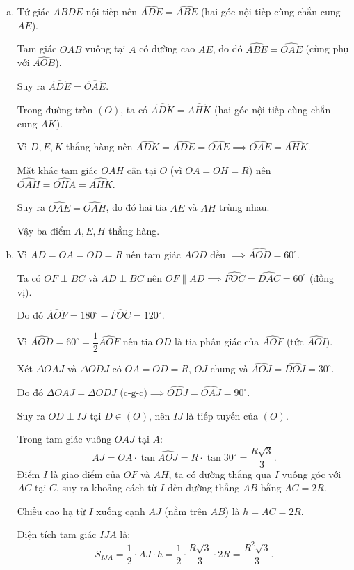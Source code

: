 \begin{bt}
{\begin{enumerate}[a)]
			Suy ra tứ giác $ABDE$ nội tiếp đường tròn đường kính $AB$.
			\item Tứ giác $ABDE$ nội tiếp nên $\widehat{ADE} = \widehat{ABE}$ (hai góc nội tiếp cùng chắn cung $AE$).
			
			Tam giác $OAB$ vuông tại $A$ có đường cao $AE$, do đó $\widehat{ABE} = \widehat{OAE}$ (cùng phụ với $\widehat{AOB}$).
			
			Suy ra $\widehat{ADE} = \widehat{OAE}$.
			
			Trong đường tròn $(O)$, ta có $\widehat{ADK} = \widehat{AHK}$ (hai góc nội tiếp cùng chắn cung $AK$).
			
			Vì $D, E, K$ thẳng hàng nên $\widehat{ADK} = \widehat{ADE} = \widehat{OAE} \implies \widehat{OAE} = \widehat{AHK}$.
			
			Mặt khác tam giác $OAH$ cân tại $O$ (vì $OA = OH = R$) nên $\widehat{OAH} = \widehat{OHA} = \widehat{AHK}$.
			
			Suy ra $\widehat{OAE} = \widehat{OAH}$, do đó hai tia $AE$ và $AH$ trùng nhau.
			
			Vậy ba điểm $A, E, H$ thẳng hàng.
			\item Vì $AD = OA = OD = R$ nên tam giác $AOD$ đều $\implies \widehat{AOD} = 60^\circ$.
			
			Ta có $OF \perp BC$ và $AD \perp BC$ nên $OF \parallel AD \implies \widehat{FOC} = \widehat{DAC} = 60^\circ$ (đồng vị).
			
			Do đó $\widehat{AOF} = 180^\circ - \widehat{FOC} = 120^\circ$.
			
			Vì $\widehat{AOD} = 60^\circ = \dfrac{1}{2}\widehat{AOF}$ nên tia $OD$ là tia phân giác của $\widehat{AOF}$ (tức $\widehat{AOI}$).
			
			Xét $\Delta OAJ$ và $\Delta ODJ$ có $OA = OD = R$, $OJ$ chung và $\widehat{AOJ} = \widehat{DOJ} = 30^\circ$.
			
			Do đó $\Delta OAJ = \Delta ODJ\text{ (c-g-c)} \implies \widehat{ODJ} = \widehat{OAJ} = 90^\circ$.
			
			Suy ra $OD \perp IJ$ tại $D \in (O)$, nên $IJ$ là tiếp tuyến của $(O)$.
			
			Trong tam giác vuông $OAJ$ tại $A$:
			$$AJ = OA \cdot \tan\widehat{AOJ} = R \cdot \tan 30^\circ = \dfrac{R\sqrt{3}}{3}.$$
			Điểm $I$ là giao điểm của $OF$ và $AH$, ta có đường thẳng qua $I$ vuông góc với $AC$ tại $C$, suy ra khoảng cách từ $I$ đến đường thẳng $AB$ bằng $AC = 2R$.
			
			Chiều cao hạ từ $I$ xuống cạnh $AJ$ (nằm trên $AB$) là $h = AC = 2R$.
			
			Diện tích tam giác $IJA$ là:
			$$S_{IJA} = \dfrac{1}{2} \cdot AJ \cdot h = \dfrac{1}{2} \cdot \dfrac{R\sqrt{3}}{3} \cdot 2R = \dfrac{R^2\sqrt{3}}{3}.$$
		\end{enumerate}
	}
\end{bt}

